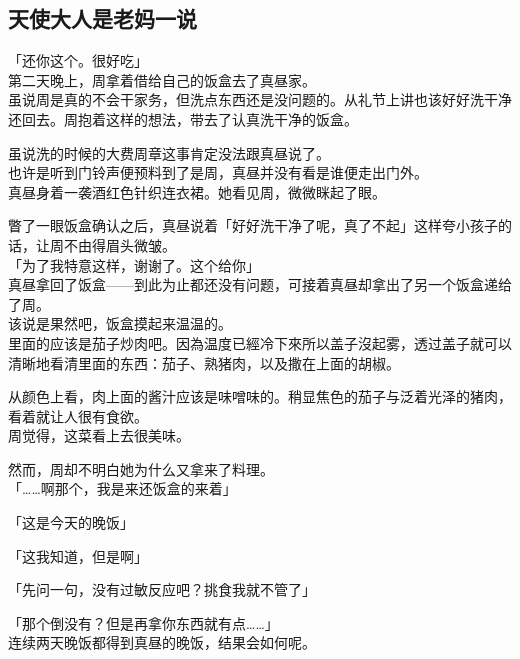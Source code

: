 \subsection{天使大人是老妈一说}

「还你这个。很好吃」\\

第二天晚上，周拿着借给自己的饭盒去了真昼家。\\

虽说周是真的不会干家务，但洗点东西还是没问题的。从礼节上讲也该好好洗干净还回去。周抱着这样的想法，带去了认真洗干净的饭盒。

虽说洗的时候的大费周章这事肯定没法跟真昼说了。\\

也许是听到门铃声便预料到了是周，真昼并没有看是谁便走出门外。\\

真昼身着一袭酒红色针织连衣裙。她看见周，微微眯起了眼。

瞥了一眼饭盒确认之后，真昼说着「好好洗干净了呢，真了不起」这样夸小孩子的话，让周不由得眉头微皱。\\

「为了我特意这样，谢谢了。这个给你」\\

真昼拿回了饭盒——到此为止都还没有问题，可接着真昼却拿出了另一个饭盒递给了周。\\

该说是果然吧，饭盒摸起来温温的。\\

里面的应该是茄子炒肉吧。因為温度已經冷下來所以盖子沒起雾，透过盖子就可以清晰地看清里面的东西：茄子、熟猪肉，以及撒在上面的胡椒。

从颜色上看，肉上面的酱汁应该是味噌味的。稍显焦色的茄子与泛着光泽的猪肉，看着就让人很有食欲。\\

周觉得，这菜看上去很美味。

然而，周却不明白她为什么又拿来了料理。\\

「……啊那个，我是来还饭盒的来着」

「这是今天的晚饭」

「这我知道，但是啊」

「先问一句，没有过敏反应吧？挑食我就不管了」

「那个倒没有？但是再拿你东西就有点……」\\

连续两天晚饭都得到真昼的晚饭，结果会如何呢。\\

